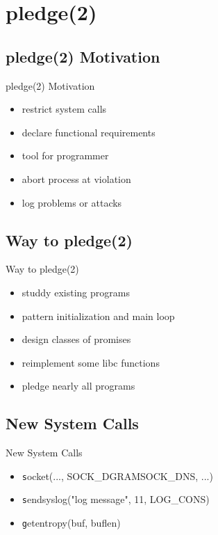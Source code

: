 \documentclass[14pt]{beamer}
\begin{document}
\section{pledge(2)}

\subsection{pledge(2) Motivation}
\begin{frame}{pledge(2) Motivation}
\begin{itemize}
    \item restrict system calls
    \item declare functional requirements
    \item tool for programmer
    \item abort process at violation
    \item log problems or attacks
\end{itemize}
\end{frame}

\subsection{Way to pledge(2)}
\begin{frame}{Way to pledge(2)}
\begin{itemize}
    \item studdy existing programs
    \item pattern initialization and main loop
    \item design classes of promises
    \item reimplement some libc functions
    \item pledge nearly all programs
\end{itemize}
\end{frame}

\subsection{New System Calls}
\begin{frame}{New System Calls}
\begin{itemize}
    \item {\texttt socket(..., SOCK\_DGRAM\textpipe{}SOCK\_DNS, ...) }
    \item {\texttt sendsyslog("log message", 11, LOG\_CONS) }
    \item {\texttt getentropy(buf, buflen) }
\end{itemize}
\end{frame}
\end{document}
